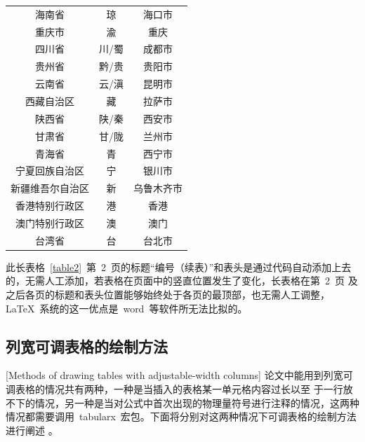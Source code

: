 \begin{longtable}{ccc}
海南省 & 琼 & 海口市\\
重庆市 & 渝 & 重庆\\
四川省 & 川/蜀 & 成都市\\
贵州省 & 黔/贵 & 贵阳市\\
云南省 & 云/滇 & 昆明市\\
西藏自治区 & 藏 & 拉萨市\\
陕西省 & 陕/秦 & 西安市\\
甘肃省 & 甘/陇 & 兰州市\\
青海省 & 青 & 西宁市\\
宁夏回族自治区 & 宁 & 银川市\\
新疆维吾尔自治区 & 新 & 乌鲁木齐市\\
香港特别行政区 & 港 & 香港\\
澳门特别行政区 & 澳 & 澳门\\
台湾省 & 台 & 台北市\\
\end{longtable}\normalsize
\vspace{-1em}

此长表格~\ref{table2}~第~2~页的标题“编号（续表）”和表头是通过代码自动添加上去的，无需人工添加，若表格在页面中的竖直位置发生了变化，长表格在第~2~页
及之后各页的标题和表头位置能够始终处于各页的最顶部，也无需人工调整，\LaTeX~系统的这一优点是~word~等软件所无法比拟的。

\subsection{列宽可调表格的绘制方法}[Methods of drawing tables with adjustable-width columns]
论文中能用到列宽可调表格的情况共有两种，一种是当插入的表格某一单元格内容过长以至
于一行放不下的情况，另一种是当对公式中首次出现的物理量符号进行注释的情况，这两种
情况都需要调用~tabularx~宏包。下面将分别对这两种情况下可调表格的绘制方法进行阐述
。
